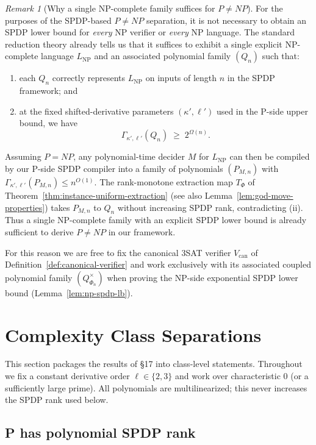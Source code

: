 \documentclass[12pt]{article}
\theoremstyle{definition}
\theoremstyle{definition}
\theoremstyle{remark}
\newtheorem{remark}{Remark}
\theoremstyle{remark}
\begin{document}
\begin{remark}[Why a single NP-complete family suffices for $P\neq NP$]
\label{rem:single-np-family-suffices}
For the purposes of the SPDP-based $P\neq NP$ separation, it is not necessary
to obtain an SPDP lower bound for \emph{every} NP verifier or \emph{every}
NP language. The standard reduction theory already tells us that it suffices
to exhibit a single explicit NP-complete language $L_{\mathrm{NP}}$ and an
associated polynomial family $(Q_n)$ such that:
\begin{enumerate}[label=(\roman*)]
  \item each $Q_n$ correctly represents $L_{\mathrm{NP}}$ on inputs of length
  $n$ in the SPDP framework; and
  \item at the fixed shifted-derivative parameters $(\kappa',\ell')$ used in the
  P-side upper bound, we have
  \[
     \Gamma_{\kappa',\ell'}(Q_n) \;\ge\; 2^{\Omega(n)}.
  \]
\end{enumerate}
Assuming $P = NP$, any polynomial-time decider $M$ for $L_{\mathrm{NP}}$ can
then be compiled by our P-side SPDP compiler into a family of polynomials
$(P_{M,n})$ with $\Gamma_{\kappa',\ell'}(P_{M,n}) \le n^{O(1)}$. The rank-monotone
extraction map $T_\Phi$ of Theorem~\ref{thm:instance-uniform-extraction} (see also Lemma~\ref{lem:god-move-properties}) takes
$P_{M,n}$ to $Q_n$ without increasing SPDP rank, contradicting (ii). Thus a
single NP-complete family with an explicit SPDP lower bound is already
sufficient to derive $P\neq NP$ in our framework.

For this reason we are free to fix the canonical 3SAT verifier
$V_{\mathrm{can}}$ of Definition~\ref{def:canonical-verifier} and work
exclusively with its associated coupled polynomial family $(Q^{\times}_{\Phi_n})$ when proving
the NP-side exponential SPDP lower bound (Lemma~\ref{lem:np-spdp-lb}).
\end{remark}

\section{Complexity Class Separations}

This section packages the results of \S17 into class-level statements. Throughout we fix a constant derivative order $\ell\in\{2,3\}$ and work over characteristic $0$ (or a sufficiently large prime). All polynomials are multilinearized; this never increases the SPDP rank used below.

\subsection{P has polynomial SPDP rank}
\end{document}
